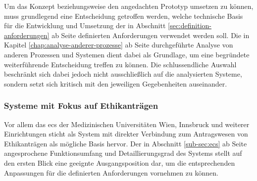 \documentclass[a4paper,12pt,twoside]{scrreprt}
\begin{document}
Um das Konzept beziehungsweise den angedachten Prototyp umsetzen zu können, muss grundlegend eine Entscheidung getroffen werden, welche technische Basis für die Entwicklung und Umsetzung der in Abschnitt \ref{sec:definition-anforderungen} ab Seite \pageref{sec:definition-anforderungen} definierten Anforderungen verwendet werden soll. Die in Kapitel \ref{chap:analyse-anderer-prozesse} ab Seite \pageref{chap:analyse-anderer-prozesse} durchgeführte Analyse von anderen Prozessen und Systemen dient dabei als Grundlage, um eine begründete weiterführende Entscheidung treffen zu können. Die schlussendliche Auswahl beschränkt sich dabei jedoch nicht ausschließlich auf die analysierten Systeme, sondern setzt sich kritisch mit den jeweiligen Gegebenheiten auseinander.

\subsubsection*{Systeme mit Fokus auf Ethikanträgen}
\label{sub-sub-sec:technische-basis-fokus-ethikanträge}

Vor allem das \acl{ecs} der Medizinischen Universitäten Wien, Innsbruck und weiterer Einrichtungen sticht als System mit direkter Verbindung zum Antragswesen von Ethikanträgen als mögliche Basis hervor. Der in Abschnitt \ref{sub-sec:ecs} ab Seite \pageref{sub-sec:ecs} angesprochene Funktionsumfang und Detaillierungsgrad des Systems stellt auf den ersten Blick eine geeignte Ausgangsposition dar, um die entsprechenden Anpassungen für die definierten Anforderungen vornehmen zu können.
\end{document}
